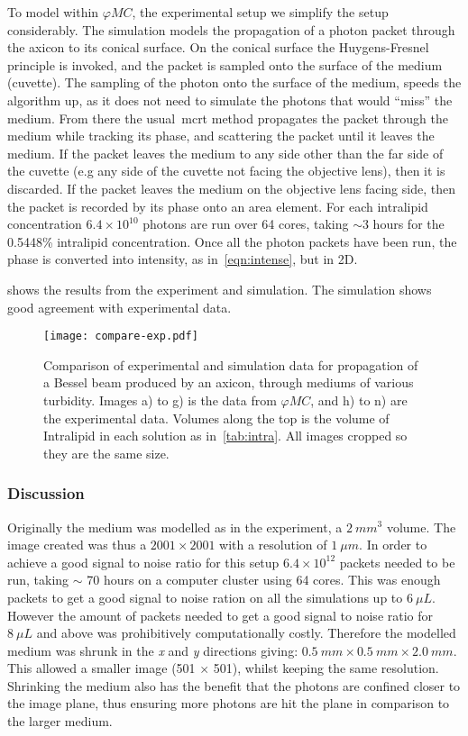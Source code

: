 To model within $\varphi MC$, the experimental setup we simplify the setup considerably.
The simulation models the propagation of a photon packet through the axicon to its conical surface. 
On the conical surface the Huygens-Fresnel principle is invoked, and the packet is sampled onto the surface of the medium (cuvette).
The sampling of the photon onto the surface of the medium, speeds the algorithm up, as it does not need to simulate the photons that would ``miss'' the medium.
From there the usual~\gls*{mcrt} method propagates the packet through the medium while tracking its phase, and scattering the packet until it leaves the medium.
If the packet leaves the medium to any side other than the far side of the cuvette (e.g any side of the cuvette not facing the objective lens), then it is discarded.
If the packet leaves the medium on the objective lens facing side, then the packet is recorded by its phase onto an area element.
For each intralipid concentration $6.4\times10^{10}$ photons are run over 64 cores, taking $\sim 3$ hours for the 0.5448\% intralipid concentration.
Once all the photon packets have been run, the phase is converted into intensity, as in~\cref{eqn:intense}, but in 2D.

 shows the results from the experiment and simulation. The simulation shows good agreement with experimental data.

\begin{figure}[!ht]
\centering
\texttt{[image: compare-exp.pdf]}
\caption{Comparison of experimental and simulation data for propagation of a Bessel beam produced by an axicon, through mediums of various turbidity. Images a) to g) is the data from $\varphi MC$, and h) to n) are the experimental data. Volumes along the top is the volume of Intralipid in each solution as in~\cref{tab:intra}. All images cropped so they are the same size.}
\label{fig:compareexpbessel}
\end{figure}

\subsubsection*{Discussion}

Originally the medium was modelled as in the experiment, a $2~mm^3$ volume.
The image created was thus a $2001 \times 2001$ with a resolution of $1~\mu m$.
In order to achieve a good signal to noise ratio for this setup $6.4\times10^{12}$ packets needed to be run, taking $\sim$ 70 hours on a computer cluster using 64 cores.
This was enough packets to get a good signal to noise ration on all the simulations up to $6~\mu L$.
However the amount of packets needed to get a good signal to noise ratio for $8~\mu L$ and above was prohibitively computationally costly.
Therefore the modelled medium was shrunk in the \textit{x} and \textit{y} directions giving: $0.5~mm \times 0.5~mm \times 2.0~mm$.
This allowed a smaller image (501 $\times$ 501), whilst keeping the same resolution.
Shrinking the medium also has the benefit that the photons are confined closer to the image plane, thus ensuring more photons are hit the plane in comparison to the larger medium. 

